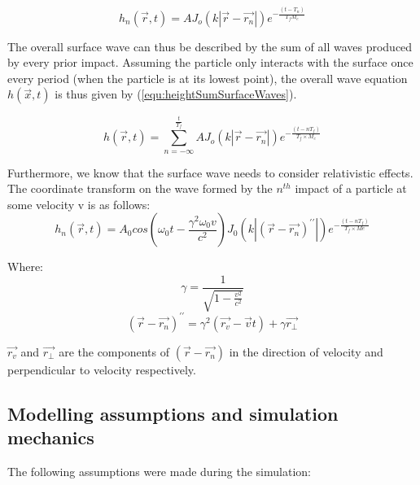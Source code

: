 \begin{equation}
h_n(\vec{r} , t) = A J_o\left(k\left|\vec{r} - \vec{r_n}\right| \right) e^{-\frac{\left(t-T_n\right)}{T_f M_e}}
\label{equ:heightSurfaceWave}
\end{equation}

The overall surface wave can thus be described by the sum of all waves produced by every prior impact. Assuming the particle only interacts with the surface once every period (when the particle is at its lowest point), the overall wave equation $h (\vec{x} , t)$ is thus given by (\ref{equ:heightSumSurfaceWaves}).

\begin{equation}
h(\vec{r} , t) = \sum_{n=-\infty}^{\frac{t}{T_f}} A J_o\left(k\left|\vec{r} - \vec{r_n}\right| \right) e^{-\frac{\left(t-n T_f\right)}{T_f\times M_e}}
\label{equ:heightSumSurfaceWaves}
\end{equation}

Furthermore, we know that the surface wave needs to consider relativistic effects. The coordinate transform on the wave formed by the $n^{th}$ impact of a particle at some velocity v is as follows:
\begin{equation}
h_n(\vec{r} , t) = A_0 cos\left(\omega_0 t - \frac{\gamma^2 \omega_0 v}{c^2}\right) J_0\left(k \left| \left(\vec{r} - \vec{r_n}\right)^{\prime \prime}  \right| \right)e^{-\frac{\left(t-n T_f\right)}{T_f\times Me}}
\end{equation}

Where:
\begin{equation}
\gamma = \frac{1}{\sqrt{1-\frac{v^2}{c^2}}}
\end{equation}
\begin{equation}
\left(\vec{r} - \vec{r_n}\right)^{\prime \prime} = \gamma^2(\vec{r_v}-\vec{v}t)+\gamma\vec{r_{\perp}}
\end{equation}

$\vec{r_v}$ and $\vec{r_{\perp}}$ are the components of $\left(\vec{r} - \vec{r_n}\right)$ in the direction of velocity and perpendicular to velocity respectively.

\subsection{Modelling assumptions and simulation mechanics}

The following assumptions were made during the simulation: 


